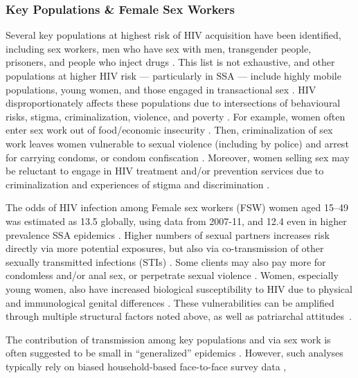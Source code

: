 \subsubsection{Key Populations \& Female Sex Workers}\label{intro.hiv.epi.kp}
Several key populations at highest risk of HIV acquisition have been identified, including
sex workers, men who have sex with men, transgender people, prisoners, and people who inject drugs
\cite{Mathers2008,Beyrer2012,Baral2012,Scorgie2012,Shannon2015,Rubenstein2016,WHO2016kp,Jin2021}.
This list is not exhaustive, and other populations at higher HIV risk --- particularly in SSA ---
include highly mobile populations, young women, and those engaged in transactional sex
\cite{Oldenburg2014,Wamoyi2016,Camlin2019,Cheuk2020,Day2020,Khalifa2022}.
HIV disproportionately affects these populations due to intersections of
behavioural risks, stigma, criminalization, violence, and poverty \cite{WHO2016kp}.
For example, women often enter sex work out of food/economic insecurity \cite{Scorgie2012}.
Then, criminalization of sex work leaves women vulnerable to sexual violence (including by police)
and arrest for carrying condoms, or condom confiscation \cite{Scorgie2012,Shannon2015}.
Moreover, women selling sex may be reluctant to engage in HIV treatment and/or prevention services
due to criminalization and experiences of stigma and discrimination \cite{Lancaster2016,Spyrelis2022}.
\par
The odds of HIV infection among Female sex workers (FSW)
\vs women aged 15--49 was estimated as 13.5 globally, using data from 2007-11,
and 12.4 even in higher prevalence SSA epidemics \cite{Baral2012}.
Higher numbers of sexual partners increases risk directly via more potential exposures,
but also via co-transmission of other sexually transmitted infections (STIs) \cite{Scorgie2012}.
Some clients may also pay more for condomless and/or anal sex,
or perpetrate sexual violence \cite{Scorgie2012,Shannon2015}.
Women, especially young women, also have increased biological susceptibility to HIV
due to physical and immunological genital differences \cite{Yi2013}.
These vulnerabilities can be amplified through multiple structural factors noted above,
as well as patriarchal attitudes~\cite{Scorgie2012,Shannon2015}.
\par
The contribution of transmission among key populations and via sex work
is often suggested to be small in ``generalized'' epidemics \cite{Leclerc2008,Shubber2014}.
However, such analyses typically rely on
biased household-based face-to-face survey data \cite{Langhaug2010,Lowndes2012},
